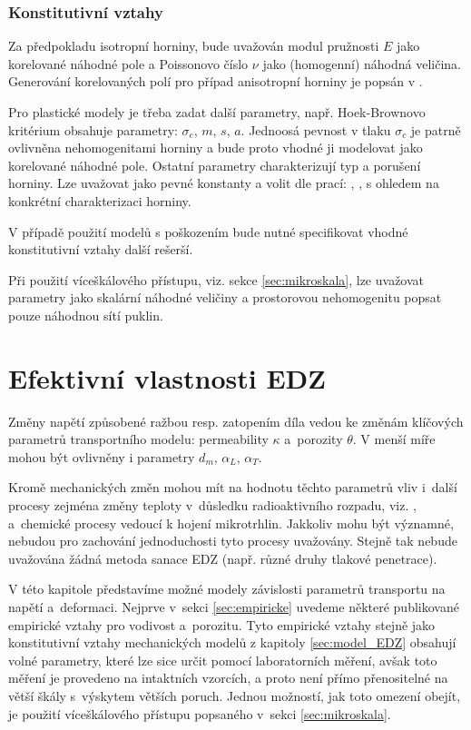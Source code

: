 \documentclass{article}
\begin{document}
\subsubsection{Konstitutivní vztahy}
Za předpokladu isotropní horniny, bude uvažován modul pružnosti $E$  jako korelované náhodné pole 
a Poissonovo číslo $\nu$ jako (homogenní) náhodná veličina. Generování korelovaných polí pro případ 
anisotropní horniny je popsán v \cite{Tang2018}.

Pro plastické modely je třeba zadat další parametry, např. Hoek-Brownovo kritérium obsahuje parametry:
$\sigma_c$, $m$, $s$, $a$. Jednoosá pevnost v tlaku $\sigma_c$ je patrně ovlivněna nehomogenitami horniny a bude proto vhodné 
ji modelovat jako  korelované náhodné pole. Ostatní parametry charakterizují typ a porušení horniny. Lze uvažovat jako pevné konstanty
a volit dle prací: \cite{Martin1999}, \cite{Hajiabdolmajid2002}, \cite{Hoek2002} s ohledem na konkrétní charakterizaci horniny.

V případě použití modelů s poškozením bude nutné specifikovat vhodné konstitutivní vztahy další rešerší.


Při použití víceškálového přístupu, viz. sekce \ref{sec:mikroskala}, lze uvažovat parametry jako skalární náhodné veličiny a
prostorovou nehomogenitu popsat pouze náhodnou sítí puklin.



\section{Efektivní vlastnosti EDZ}
\label{sec:micro_EDZ}
Změny napětí způsobené ražbou resp. zatopením díla vedou ke změnám klíčových parametrů transportního modelu:
permeability $\kappa$ a~porozity $\theta$. V menší míře mohou být ovlivněny i parametry $d_m$, $\alpha_L$, $\alpha_T$.

Kromě mechanických změn mohou mít na hodnotu těchto parametrů vliv i~další procesy zejména změny teploty v~důsledku radioaktivního rozpadu, viz. \cite{Blaheta2013a}, 
a~chemické procesy vedoucí k hojení mikrotrhlin. Jakkoliv mohu být významné, nebudou pro zachování jednoduchosti tyto procesy uvažovány.
Stejně tak nebude uvažována žádná metoda sanace EDZ (např. různé druhy tlakové penetrace).

V této kapitole představíme možné modely závislosti parametrů transportu na napětí a~deformaci.
Nejprve v~sekci \ref{sec:empiricke} uvedeme některé publikované empirické vztahy pro vodivost a~porozitu.
Tyto empirické vztahy stejně jako konstitutivní vztahy mechanických modelů z kapitoly \ref{sec:model_EDZ} 
obsahují volné parametry, které lze sice určit pomocí laboratorních měření, avšak toto měření je provedeno na intaktních vzorcích,
a proto není přímo přenositelné na větší škály s~výskytem větších poruch. Jednou možností, jak toto omezení obejít, je
použití víceškálového přístupu popsaného v~sekci  \ref{sec:mikroskala}.
\end{document}
